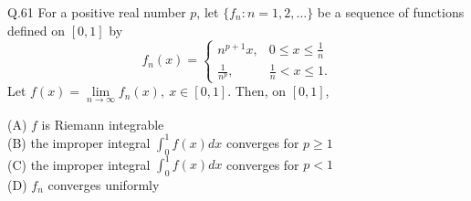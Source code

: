 \documentclass{article}
\begin{document}
																																																																																																								       Q.61 \quad For a positive real number $p$, let $\{f_n: n=1,2,\dots\}$ be a sequence of functions defined on $[0,1]$ by
																																																																																																								       \[
																																																																																																								       f_n(x) =
																																																																																																								       \begin{cases}
																																																																																																								       n^{p+1} x, & 0 \leq x \leq \frac{1}{n} \\
																																																																																																								       \frac{1}{n^p}, & \frac{1}{n} < x \leq 1.
																																																																																																								       \end{cases}
																																																																																																								       \]
																																																																																																								       Let $f(x) = \lim\limits_{n \to \infty} f_n(x),\ x \in [0,1]$. Then, on $[0,1]$,

																																																																																																								       (A) $f$ is Riemann integrable \hspace{2cm}\\ 
																																																																																																								       (B) the improper integral $\int_0^1 f(x) dx$ converges for $p \geq 1$ \\
																																																																																																								       (C) the improper integral $\int_0^1 f(x) dx$ converges for $p < 1$ \hspace{2cm}\\
																																																																																																								       (D) $f_n$ converges uniformly

																																																																																																								       \vspace{0.5cm}
\end{document}
